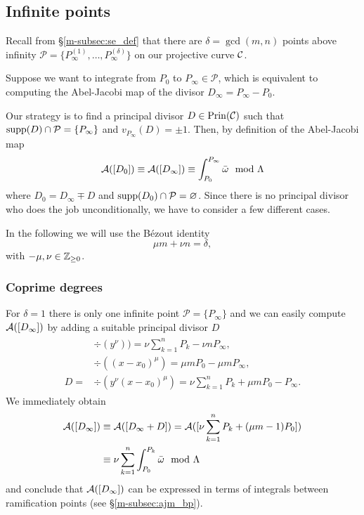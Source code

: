 \documentclass[main.tex]{subfiles}
\begin{document}
  
  
  \subsection{Infinite points}\label{subsec:ajm_infty}

  Recall from \S \ref{m-subsec:se_def} that there are $\delta = \gcd(m,n)$ points above infinity $\mathcal{P}
  = \{ P_{\infty}^{(1)},\dots, P_{\infty}^{(\delta)} \}$ on our projective curve $\mathcal{C}$.
  
  Suppose we want to integrate from $P_0$ to $P_{\infty} \in \mathcal{P}$, which is equivalent to computing the Abel-Jacobi map of the divisor
  $D_{\infty} = P_{\infty} - P_0$.

  Our strategy is to find a principal divisor $D \in \operatorname{Prin}(\mathcal{C})$ such that $\operatorname{supp}(D) \cap \mathcal{P} = \{ P_{\infty} \}$
  and $v_{P_{\infty}}(D) = \pm 1$. Then, by definition of the Abel-Jacobi map
  \begin{equation}
  \mathcal{A}([D_0]) \equiv \mathcal{A}([D_{\infty}]) \equiv \int_{P_0}^{P_{\infty}} \bar{\omega} \mod \Lambda
  \end{equation}
  where $D_0 = D_{\infty} \mp D$ and $\operatorname{supp}(D_0) \cap \mathcal{P} = \varnothing$.
  Since there is no principal divisor who does the job unconditionally, we have to consider a few different cases.
  
  In the following we will use the Bézout identity
  \begin{equation}
    \mu m + \nu n = \delta,
  \end{equation}
  with $-\mu,\nu \in \mathbb{Z}_{\ge 0}$.
  
  
  \subsubsection{Coprime degrees}\label{subsec:ajm_inf_cop}
  
  For $\delta = 1$ there is only one infinite point $\mathcal{P} = \{ P_{\infty} \}$ and
  we can easily compute  $\mathcal{A}( [D_{\infty}] )$ by adding a suitable
  principal divisor $D$
    \begin{align}
     \begin{split}
      &\div(y^{\nu}) ) =  \nu \sum_{k = 1}^n P_k - \nu n P_{\infty},\\
      &\div((x-x_0)^{\mu})  =  \mu m P_0 - \mu m P_{\infty} ,\\
      D  =  & \div(y^{\nu}(x-x_0)^{\mu})  = \nu \sum_{k = 1}^n P_k + \mu m P_0 - P_{\infty}.
     \end{split}
    \end{align}
    We immediately obtain
    \begin{align}
     \mathcal{A}( [D_{\infty}] )  & \equiv  \mathcal{A}([D_{\infty} + D])  =  \mathcal{A}( [ \nu \sum_{k = 1}^n P_k + (\mu m - 1) P_0 ]  ) \\ & 
      \equiv   \nu \sum_{k=1}^n \int_{P_0}^{P_k} \bar{\omega} \mod \Lambda
    \end{align}
    and conclude that $\mathcal{A}( [D_{\infty}] )$ can be expressed in terms of integrals between
    ramification points (see \S \ref{m-subsec:ajm_bp}).
   
\end{document}
